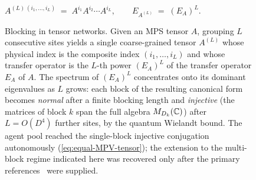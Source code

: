 \begin{figure}[t]
{%
    }
    \\[0.15em]
    {\footnotesize
        $\displaystyle
            A^{(L)\,(i_1,\ldots,i_L)} \;=\; A^{i_1} A^{i_2} \cdots A^{i_L},
            \qquad
            E_{A^{(L)}} \;=\; {(E_A)}^L$.}
    \caption{Blocking in tensor networks.
        Given an MPS tensor $A$, grouping $L$ consecutive sites yields a single coarse-grained tensor $A^{(L)}$ whose physical index is the composite index $(i_1,\ldots,i_L)$ and whose transfer operator is the $L$-th power ${(E_A)}^L$ of the transfer operator $E_A$ of $A$.
        The spectrum of ${(E_A)}^L$ concentrates onto its dominant eigenvalues as $L$ grows: each block of the resulting canonical form becomes
        \emph{normal} after a finite blocking length and \emph{injective}
        (the matrices of block $k$ span the full algebra
        $M_{D_k}(\mathbb{C})$)
        after $L = O(D^4)$ further sites, by the quantum Wielandt bound.
        The agent pool reached the single-block injective conjugation autonomously (\cref{eq:equal-MPV-tensor}); the extension to the multi-block regime indicated here was recovered only after the primary references~\cite{Perez-Garcia2007Matrix,Cirac2017Matrixa} were supplied.}\label{fig:blocking}
\end{figure}

